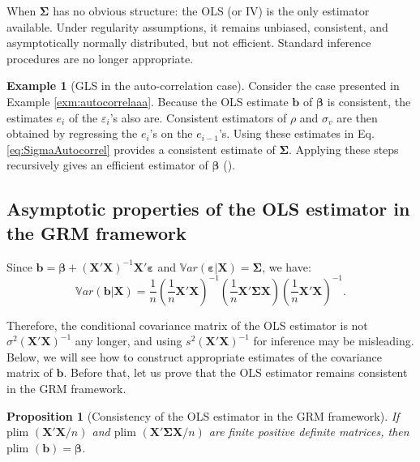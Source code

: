 \documentclass[
  12pt,
]{book}
\newtheorem{proposition}{Proposition}[chapter]
\theoremstyle{definition}
\theoremstyle{definition}
\newtheorem{example}{Example}[chapter]
\theoremstyle{definition}
\theoremstyle{definition}
\theoremstyle{remark}
\begin{document}
When \(\boldsymbol\Sigma\) has no obvious structure: the OLS (or IV) is the only estimator available. Under regularity assumptions, it remains unbiased, consistent, and asymptotically normally distributed, but not efficient. Standard inference procedures are no longer appropriate.

\begin{example}[GLS in the auto-correlation case]
\protect\hypertarget{exm:autocorrelaaa2}{}\label{exm:autocorrelaaa2}Consider the case presented in Example \ref{exm:autocorrelaaa}. Because the OLS estimate \(\mathbf{b}\) of \(\boldsymbol\beta\) is consistent, the estimates \(e_i\) of the \(\varepsilon_i\)'s also are. Consistent estimators of \(\rho\) and \(\sigma_v\) are then obtained by regressing the \(e_i\)'s on the \(e_{i-1}\)'s. Using these estimates in Eq. \eqref{eq:SigmaAutocorrel} provides a consistent estimate of \(\boldsymbol\Sigma\). Applying these steps recursively gives an efficient estimator of \(\boldsymbol\beta\) (\citet{Cochrane_Orcutt_1949}).
\end{example}

\hypertarget{asymptotic-properties-of-the-ols-estimator-in-the-grm-framework}{%
\subsection{Asymptotic properties of the OLS estimator in the GRM framework}\label{asymptotic-properties-of-the-ols-estimator-in-the-grm-framework}}

Since \(\mathbf{b} = \boldsymbol\beta + \left(\mathbf{X}'\mathbf{X}\right)^{-1} \mathbf{X}'\boldsymbol\varepsilon\) and \(\mathbb{V}ar(\boldsymbol\varepsilon|\mathbf{X})=\boldsymbol\Sigma\), we have:
\begin{equation}
\mathbb{V}ar(\mathbf{b}|\mathbf{X}) = \frac{1}{n}\left(\frac{1}{n}\mathbf{X}'\mathbf{X}\right)^{-1}\left(\frac{1}{n}\mathbf{X}'\boldsymbol\Sigma\mathbf{X}\right)\left(\frac{1}{n}\mathbf{X}'\mathbf{X}\right)^{-1}.\label{eq:xsx}
\end{equation}

Therefore, the conditional covariance matrix of the OLS estimator is not \(\sigma^2 (\mathbf{X}'\mathbf{X})^{-1}\) any longer, and using \(s^2 (\mathbf{X}'\mathbf{X})^{-1}\) for inference may be misleading. Below, we will see how to construct appropriate estimates of the covariance matrix of \(\mathbf{b}\). Before that, let us prove that the OLS estimator remains consistent in the GRM framework.

\begin{proposition}[Consistency of the OLS estimator in the GRM framework]
\protect\hypertarget{prp:XXX}{}\label{prp:XXX}If \(\mbox{plim }(\mathbf{X}'\mathbf{X}/n)\) and \(\mbox{plim }(\mathbf{X}'\boldsymbol\Sigma\mathbf{X}/n)\) are finite positive definite matrices, then \(\mbox{plim }(\mathbf{b})=\boldsymbol\beta\).
\end{proposition}
\end{document}
